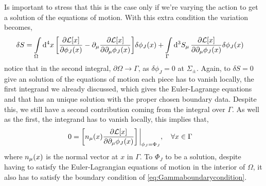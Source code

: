 Is important to stress that this is the case only if we're varying the action to get a solution of the equations of motion. With this extra condition the variation becomes,
\begin{align}
    \delta S&=\int\limits_\Omega\dd[4]{x}\qty[\pdv{\mathcal L[x]}{\phi_J\qty(x)}-\partial_\mu\pdv{\mathcal L[x]}{\partial_\mu\phi_J\qty(x)}]\delta\phi_J(x)+\int\limits_{\Gamma}\dd[3]{S_\mu}\pdv{\mathcal L[x]}{\partial_\mu\phi_J\qty(x)}\delta\phi_J(x)\label{eq:deltaSwithinitialvalue}
\end{align}
notice that in the second integral, $\partial\Omega\rightarrow \Gamma$, as $\delta\phi_J =0 $ at $\Sigma_\pm$. Again, to $\delta S =0$ give an solution of the equations of motion each piece has to vanish locally, 
the first integrand we already discussed, which gives the Euler-Lagrange equations and that has an unique solution with the proper chosen boundary data. Despite this, we still have a second contribution coming 
from the integral over $\Gamma$. As well as the first, the integrand has to vanish locally, this implies that,
\begin{align}
    0&=\qty[n_\mu\qty(x)\pdv{\mathcal L[x]}{\partial_\mu\phi_J\qty(x)}]\eval_{\phi_J=\Phi_J},\ \ \ \forall x \in \Gamma\label{eq:Gammaboundarycondition}
\end{align}
where $n_\mu\qty(x)$ is the normal vector at $x$ in $\Gamma$. To $\Phi_J$ to be a solution, despite having to satisfy the Euler-Lagrangian equations of motion in the interior of $\Omega$, 
it also has to satisfy the boundary condition of \cref{eq:Gammaboundarycondition}. 

